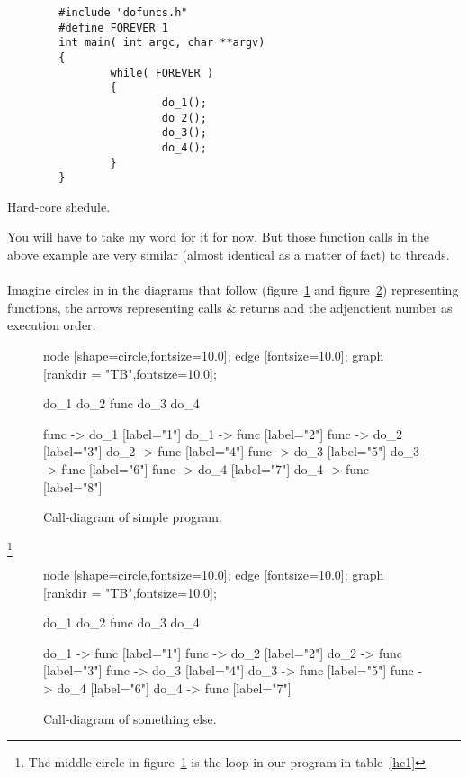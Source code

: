 		\begin{table}[!hbp]
		\begin{verbatim}
		#include "dofuncs.h"
		#define FOREVER 1
		int main( int argc, char **argv)
		{ 
        		while( FOREVER )
        		{
		                do_1();
		                do_2();
		                do_3();
		                do_4();
		        }
		}
		\end{verbatim}
		\caption{Hard-core shedule.\label{hc1}}
		\end{table}

	You will have to take my word for it for now. But those function calls in the above example are very similar (almost identical as a matter of fact) to threads.
	\\\\
	Imagine circles in in the diagrams that follow (figure~\ref{simpl1} and figure~\ref{simpl2}) representing functions, the arrows representing calls \& returns and the adjenctient number as execution order.

	\begin{figure}[!hbp]
	\begin{dotpic}
		node [shape=circle,fontsize=10.0];
		edge [fontsize=10.0];
		graph [rankdir = "TB",fontsize=10.0];

		do_1
		do_2
		func	
		do_3
		do_4

		func -> do_1		[label="1"]
		do_1 -> func		[label="2"]
		func -> do_2		[label="3"]
		do_2 -> func		[label="4"]
		func -> do_3		[label="5"]
		do_3 -> func		[label="6"]
		func -> do_4		[label="7"]
		do_4 -> func		[label="8"]
	\end{dotpic}
	\caption{Call-diagram of simple program.\label{simpl1}}	
	\end{figure}
	\footnote{The  middle circle in figure~\ref{simpl1} is the loop in our program in table~\ref{hc1}}
	\begin{figure}[!hbp]
	\begin{dotpic}
		node [shape=circle,fontsize=10.0];
		edge [fontsize=10.0];
		graph [rankdir = "TB",fontsize=10.0];

		do_1
		do_2
		func	
		do_3
		do_4

		do_1 -> func		[label="1"]
		func -> do_2		[label="2"]
		do_2 -> func		[label="3"]
		func -> do_3		[label="4"]
		do_3 -> func		[label="5"]
		func -> do_4		[label="6"]
		do_4 -> func		[label="7"]
	\end{dotpic}
	\caption{Call-diagram of something else.\label{simpl2}}
	\end{figure}
		

